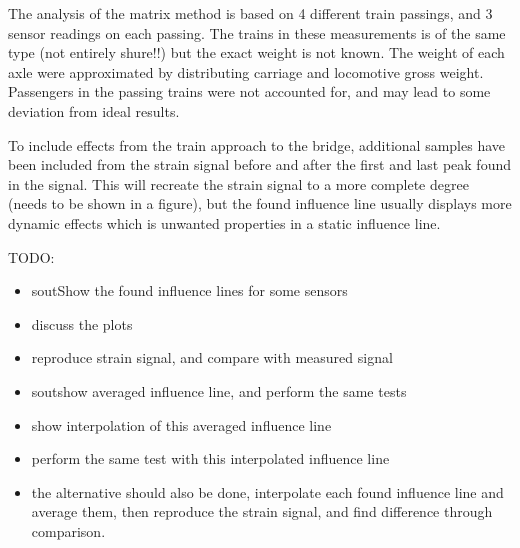 The analysis of the matrix method is based on 4 different train passings, and 3 sensor readings on each passing. The trains in these measurements is of the same type (not entirely shure!!) but the exact weight is not known. The weight of each axle were approximated by distributing carriage and locomotive gross weight. Passengers in the passing trains were not accounted for, and may lead to some deviation from ideal results.

To include effects from the train approach to the bridge, additional samples have been included from the strain signal before and after the first and last peak found in the signal. This will recreate the strain signal to a more complete degree (needs to be shown in a figure), but the found influence line usually displays more dynamic effects which is unwanted properties in a static influence line.

TODO:
\begin{itemize}
\item sout{Show the found influence lines for some sensors}
\item discuss the plots
\item reproduce strain signal, and compare with measured signal
\item sout{show averaged influence line}, and perform the same tests
\item show interpolation of this averaged influence line
\item perform the same test with this interpolated influence line
\item the alternative should also be done, interpolate each found influence line and average them, then reproduce the strain signal, and find difference through comparison.
\end{itemize}


